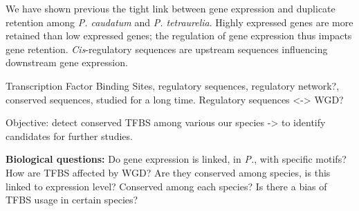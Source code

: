We have shown previous the tight link between gene expression and duplicate retention among \textit{P. caudatum} and \textit{P. tetraurelia}. Highly expressed genes are more retained than low expressed genes; the regulation of gene expression thus impacts gene retention. \textit{Cis}-regulatory sequences are upstream sequences influencing downstream gene expression.

Transcription Factor Binding Sites, regulatory sequences, regulatory network?, conserved sequences, studied for a long time. Regulatory sequences <-> WGD?

Objective: detect conserved TFBS among various our species -> to identify candidates for further studies.

\textbf{Biological questions:} Do gene expression is linked, in \textit{P.}, with specific motifs? How are TFBS affected by WGD? Are they conserved among species, is this linked to expression level? Conserved among each species? Is there a bias of TFBS usage in certain species?
